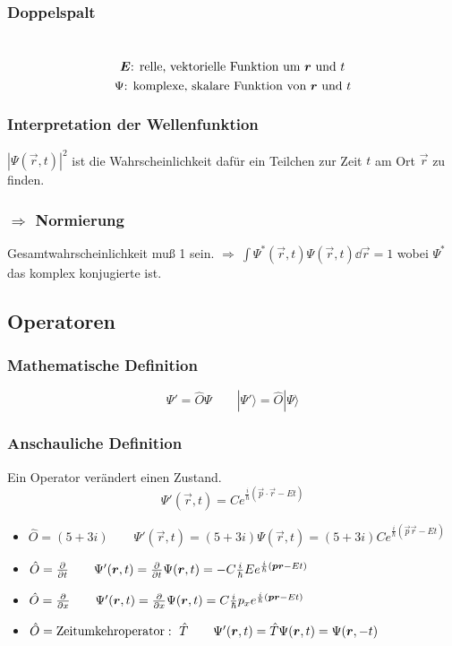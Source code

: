 \subsubsection{Doppelspalt}

\\
$$\bm{E}\textrm{: relle, vektorielle Funktion um }\bm{r}\textrm{ und }t$$
$$\Psi\textrm{: komplexe, skalare Funktion von } \bm{r} \textrm{ und }t$$

\subsubsection{Interpretation der Wellenfunktion}

$|\Psi(\vec{r},t)|^2$ ist die Wahrscheinlichkeit dafür ein Teilchen zur Zeit $t$ am Ort $\vec{r}$ zu finden.\\

\subsubsection{$\Rightarrow$ Normierung}

Gesamtwahrscheinlichkeit muß 1 sein. $\Rightarrow\ \int \Psi^*(\vec{r},t) \Psi(\vec{r},t) \dd \vec{r} = 1$ wobei $\Psi^*$ das komplex konjugierte ist.

\subsection{Operatoren}


\subsubsection{Mathematische Definition}

$$\Psi' = \hat O \Psi \qquad |\Psi'\rangle = \hat O | \Psi \rangle$$

\subsubsection{Anschauliche Definition}

Ein Operator verändert einen Zustand.\\
\bei
$$\Psi'(\vec{r},t) = C e^{\frac{i}{\hbar} (\vec{p} \cdot \vec{r} - Et)}$$
\begin{itemize}
	\item $\hat O = (5 + 3i) \qquad \Psi'(\vec{r}, t) = (5 + 3i) \Psi(\vec{r},t) = (5 +3i)C e^{\frac{i}{\hbar}(\vec{p}\vec{r}- Et)}$
	\item $\hat O = \frac{\partial }{\partial t} \qquad \Psi'(\bm{r}, t) = \frac{\partial }{\partial t}\Psi(\bm{r},t) = -C\frac{i}{\hbar}E e^{\frac{i}{\hbar}(\bm{p}\bm{r}- Et)}$
	\item $\hat O = \frac{\partial }{\partial x} \qquad \Psi'(\bm{r}, t) = \frac{\partial }{\partial x} \Psi(\bm{r},t) = C\frac{i}{\hbar}p_x e^{\frac{i}{\hbar}(\bm{p}\bm{r}- Et)}$
	\item $\hat O = \tx{Zeitumkehroperator}:\ \hat T \qquad \Psi'(\vec{r}, t) = \hat T \Psi(\vec{r},t) = \Psi(\vec{r},-t)$
\end{itemize}
